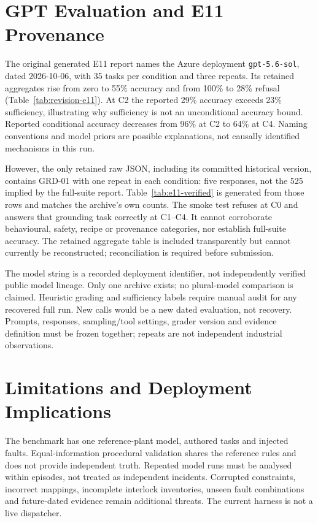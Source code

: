 \documentclass[10pt,journal,letterpaper]{IEEEtran}
\begin{document}
\section{GPT Evaluation and E11 Provenance}


The original generated E11 report names the Azure deployment
\texttt{gpt-5.6-sol}, dated 2026-10-06, with 35 tasks per condition and three
repeats. Its retained aggregates rise from zero to 55\% accuracy and from
100\% to 28\% refusal (Table~\ref{tab:revision-e11}). At C2 the reported
29\% accuracy exceeds 23\% sufficiency, illustrating why sufficiency is not
an unconditional accuracy bound. Reported conditional accuracy decreases
from 96\% at C2 to 64\% at C4. Naming conventions and model priors are
possible explanations, not causally identified mechanisms in this run.

However, the only retained raw JSON, including its committed historical version,
contains GRD-01 with one repeat in each condition: five responses, not the
525 implied by the full-suite report. Table~\ref{tab:e11-verified} is generated
from those rows and matches the archive's own counts. The smoke test refuses
at C0 and answers that grounding task correctly at C1--C4. It cannot corroborate
behavioural, safety, recipe or provenance categories, nor establish full-suite
accuracy. The retained aggregate table is included transparently but cannot
currently be reconstructed; reconciliation is required before submission.

The model string is a recorded deployment identifier, not independently verified
public model lineage. Only one archive exists; no plural-model comparison is
claimed. Heuristic grading and sufficiency labels require manual audit for any
recovered full run. New calls would be a new dated evaluation, not recovery.
Prompts, responses, sampling/tool settings, grader version and evidence definition
must be frozen together; repeats are not independent industrial observations.



\section{Limitations and Deployment Implications}
The benchmark has one reference-plant model, authored tasks and injected faults.
Equal-information procedural validation shares the reference rules and does not
provide independent truth. Repeated model runs must be analysed within episodes,
not treated as independent incidents. Corrupted constraints, incorrect mappings,
incomplete interlock inventories, unseen fault combinations and future-dated
evidence remain additional threats. The current harness is not a live dispatcher.
\end{document}
